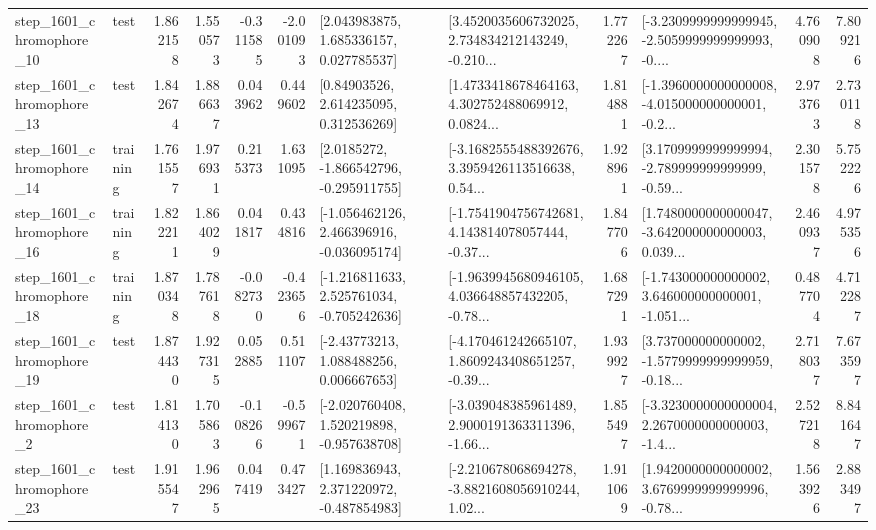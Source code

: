 \begin{tabular}{llrrrrllrlrr}
 step\_1601\_chromophore\_10 &      test &      1.862158 &    1.550573 &     -0.311585 & -2.001093 &     [2.043983875, 1.685336157, 0.027785537] &  [3.4520035606732025, 2.734834212143249, -0.210... &       1.772267 &  [-3.2309999999999945, -2.5059999999999993, -0.... &            4.760908 &          7.809216 \\
 step\_1601\_chromophore\_13 &      test &      1.842674 &    1.886637 &      0.043962 &  0.449602 &      [0.84903526, 2.614235095, 0.312536269] &  [1.4733418678464163, 4.302752488069912, 0.0824... &       1.814881 &  [-1.3960000000000008, -4.015000000000001, -0.2... &            2.973763 &          2.730118 \\
 step\_1601\_chromophore\_14 &  training &      1.761557 &    1.976931 &      0.215373 &  1.631095 &     [2.0185272, -1.866542796, -0.295911755] &  [-3.1682555488392676, 3.3959426113516638, 0.54... &       1.928961 &  [3.1709999999999994, -2.789999999999999, -0.59... &            2.301578 &          5.752226 \\
 step\_1601\_chromophore\_16 &  training &      1.822211 &    1.864029 &      0.041817 &  0.434816 &   [-1.056462126, 2.466396916, -0.036095174] &  [-1.7541904756742681, 4.143814078057444, -0.37... &       1.847706 &  [1.7480000000000047, -3.642000000000003, 0.039... &            2.460937 &          4.975356 \\
 step\_1601\_chromophore\_18 &  training &      1.870348 &    1.787618 &     -0.082730 & -0.423656 &   [-1.216811633, 2.525761034, -0.705242636] &  [-1.9639945680946105, 4.036648857432205, -0.78... &       1.687291 &  [-1.743000000000002, 3.646000000000001, -1.051... &            0.487704 &          4.712287 \\
 step\_1601\_chromophore\_19 &      test &      1.874430 &    1.927315 &      0.052885 &  0.511107 &     [-2.43773213, 1.088488256, 0.006667653] &  [-4.170461242665107, 1.8609243408651257, -0.39... &       1.939927 &  [3.737000000000002, -1.5779999999999959, -0.18... &            2.718037 &          7.673597 \\
  step\_1601\_chromophore\_2 &      test &      1.814130 &    1.705863 &     -0.108266 & -0.599671 &   [-2.020760408, 1.520219898, -0.957638708] &  [-3.039048385961489, 2.9000191363311396, -1.66... &       1.855497 &  [-3.3230000000000004, 2.2670000000000003, -1.4... &            2.527218 &          8.841647 \\
 step\_1601\_chromophore\_23 &      test &      1.915547 &    1.962965 &      0.047419 &  0.473427 &    [1.169836943, 2.371220972, -0.487854983] &  [-2.210678068694278, -3.8821608056910244, 1.02... &       1.911069 &  [1.9420000000000002, 3.6769999999999996, -0.78... &            1.563926 &          2.883497 \\

\end{tabular}
